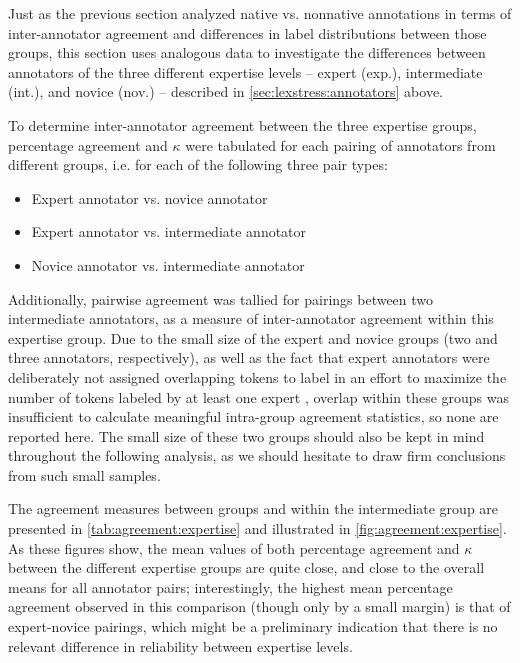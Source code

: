 
	
	Just as the previous section analyzed native vs. nonnative annotations in terms of inter-annotator agreement and differences in label distributions between those groups, this section uses analogous data to investigate the differences between annotators of the three different expertise levels -- expert (exp.), intermediate (int.), and novice (nov.) -- described in \cref{sec:lexstress:annotators} above.
	
	To determine inter-annotator agreement between the three expertise groups, percentage agreement and $\kappa$ were tabulated for each pairing of annotators from different groups, i.e. for each of the following three pair types:
	
	\begin{itemize}
	\item{Expert annotator vs. novice annotator}
	\item{Expert annotator vs. intermediate annotator}
	\item{Novice annotator vs. intermediate annotator}
	\end{itemize}
	
	Additionally, pairwise agreement was tallied for pairings between two intermediate annotators, as a measure of inter-annotator agreement within this expertise group. Due to the small size of the expert and novice groups (two and three annotators, respectively), as well as the fact that expert annotators were deliberately not assigned overlapping tokens to label in an effort to maximize the number of tokens labeled by at least one expert , overlap within these groups was insufficient to calculate meaningful intra-group agreement statistics, so none are reported here. The small size of these two groups should also be kept in mind throughout the following analysis, as we should hesitate to draw firm conclusions from such small samples. 
		
		The agreement measures between groups and within the intermediate group are presented in \cref{tab:agreement:expertise} and illustrated in \cref{fig:agreement:expertise}. As these figures show, the mean values of both percentage agreement and $\kappa$ between the different expertise groups are quite close, and close to the overall means for all annotator pairs;  interestingly, the highest mean percentage agreement observed in this comparison (though only by a small margin) is that of expert-novice pairings, which might be a preliminary indication that there is no relevant difference in reliability between expertise levels. 
			
